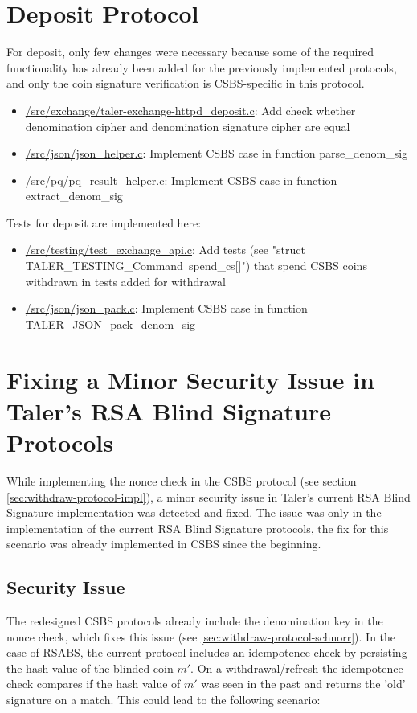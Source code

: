 \section{Deposit Protocol}
For deposit, only few changes were necessary because some of the required functionality has already been added for the previously implemented protocols, and only the coin signature verification is \gls{CSBS}-specific in this protocol.
\begin{itemize}
    \item \url{/src/exchange/taler-exchange-httpd_deposit.c}: Add check whether denomination cipher and denomination signature cipher are equal
    \item \url{/src/json/json_helper.c}: Implement \gls{CSBS} case in function parse\_denom\_sig
    \item \url{/src/pq/pq_result_helper.c}: Implement \gls{CSBS} case in function extract\_denom\_sig
\end{itemize}

Tests for deposit are implemented here:
\begin{itemize}
    \item \url{/src/testing/test_exchange_api.c}: Add tests (see "struct TALER\_TESTING\_Command\ spend\_cs[]") that spend \gls{CSBS} coins withdrawn in tests added for withdrawal
    \item \url{/src/json/json_pack.c}: Implement \gls{CSBS} case in function TALER\_JSON\_pack\_denom\_sig
\end{itemize}

\section{Fixing a Minor Security Issue in Taler's RSA Blind Signature Protocols}
\label{sec:taler-vuln}
While implementing the nonce check in the \gls{CSBS} protocol (see section \ref{sec:withdraw-protocol-impl}), a minor security issue in Taler's current RSA Blind Signature implementation was detected and fixed.
The issue was only in the implementation of the current RSA Blind Signature protocols, the fix for this scenario was already implemented in \gls{CSBS} since the beginning.

\subsection{Security Issue}
\label{sec:taler-vuln-desc}

The redesigned \gls{CSBS} protocols already include the denomination key in the nonce check, which fixes this issue (see \ref{sec:withdraw-protocol-schnorr}).
In the case of \gls{RSABS}, the current protocol includes an \gls{idempotence} check by persisting the hash value of the blinded coin $m'$.
On a withdrawal/refresh the \gls{idempotence} check compares if the hash value of $m'$ was seen in the past and returns the 'old' signature on a match.
This could lead to the following scenario:


